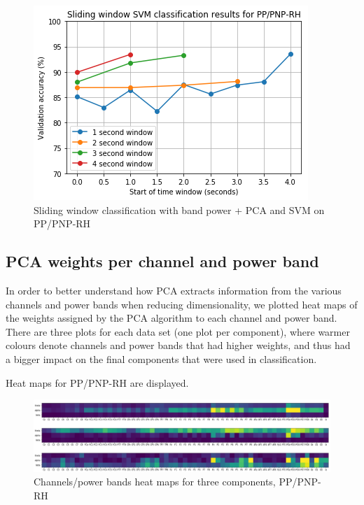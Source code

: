 \documentclass{mpaper}
\begin{document}
\begin{figure}
\begin{center}
\includegraphics[scale=0.85]{rh.png}
\end{center}
\caption{\label{fig-slid-w-rh}Sliding window classification with band power + PCA and SVM on PP/PNP-RH}
\end{figure}

\subsection{PCA weights per channel and power band}

In order to better understand how PCA extracts information from the various channels and power bands when reducing dimensionality, we plotted heat maps of the weights assigned by the PCA algorithm to each channel and power band. There are three plots for each data set (one plot per component), where warmer colours denote channels and power bands that had higher weights, and thus had a bigger impact on the final components that were used in classification.

Heat maps for PP/PNP-RH are displayed.

\begin{figure}
\begin{center}
\hspace*{-2cm}
\includegraphics[scale=0.77]{pca_bp_rh_pp_pnp.PNG}
\end{center}
\caption{\label{fig-htmp-rh}Channels/power bands heat maps for three components, PP/PNP-RH}
\end{figure}
\end{document}
